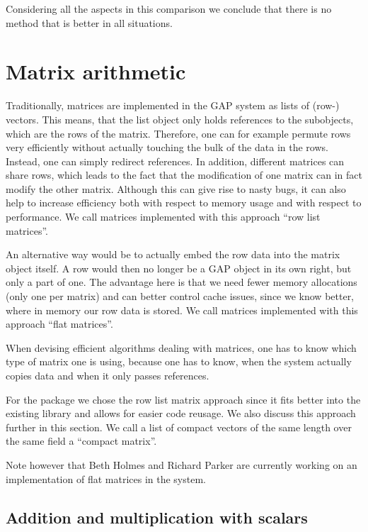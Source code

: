 Considering all the aspects in this comparison we conclude that there 
is no method that is better in all situations.


\section{Matrix arithmetic}
\label{sec:matarith}

Traditionally, matrices are implemented in the {\sf GAP} system as
lists of (row-) vectors. This means, that the list object only
holds references to the subobjects, which are the rows of the matrix.
Therefore, one can for example permute rows very efficiently without
actually touching the bulk of the data in the rows. Instead, one can
simply redirect references. In addition, different matrices can share
rows, which leads to the fact that the modification of one matrix
can in fact modify the other matrix. Although this can give rise to
nasty bugs, it can also help to increase efficiency both with respect
to memory usage and with respect to performance. We call matrices
implemented with this approach ``row list matrices''.

An alternative way would be to actually embed the row data into the
matrix object itself. A row would then no longer be a {\sf GAP} object
in its own right, but only a part of one. The advantage here is that
we need fewer memory allocations (only one per matrix) and can better
control cache issues, since we know better, where in memory our row data
is stored. We call matrices implemented with this approach ``flat
matrices''.

When devising efficient algorithms dealing with matrices, one has to know
which type of matrix one is using, because one has to know, when the
system actually copies data and when it only passes references.

For the {\cvec} package we chose the row list matrix approach since it fits
better into the existing {\GAP} library and allows for easier code reusage.
We also discuss this approach further in this section. We call a list
of compact vectors of the same length over the same field a ``compact
matrix''.

Note however that Beth Holmes and Richard Parker are currently working
on an implementation of flat matrices in the {\GAP} system.


\subsection{Addition and multiplication with scalars}
\label{addmulsca}

